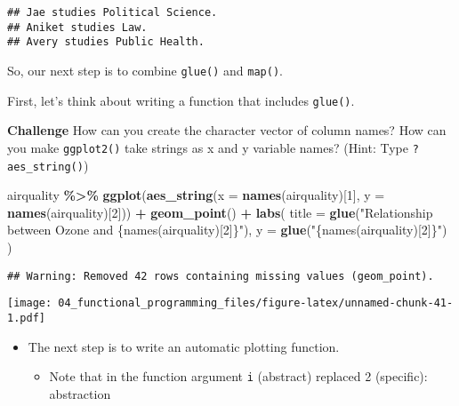 \documentclass[
]{book}
\newenvironment{Shaded}{\begin{snugshade}}{\end{snugshade}}
\newcommand{\DataTypeTok}[1]{\textcolor[rgb]{0.13,0.29,0.53}{#1}}
\newcommand{\DecValTok}[1]{\textcolor[rgb]{0.00,0.00,0.81}{#1}}
\newcommand{\KeywordTok}[1]{\textcolor[rgb]{0.13,0.29,0.53}{\textbf{#1}}}
\newcommand{\NormalTok}[1]{#1}
\newcommand{\OperatorTok}[1]{\textcolor[rgb]{0.81,0.36,0.00}{\textbf{#1}}}
\newcommand{\StringTok}[1]{\textcolor[rgb]{0.31,0.60,0.02}{#1}}
\providecommand{\tightlist}{%
  \setlength{\itemsep}{0pt}\setlength{\parskip}{0pt}}
\begin{document}
\begin{verbatim}
## Jae studies Political Science.
## Aniket studies Law.
## Avery studies Public Health.
\end{verbatim}

So, our next step is to combine \texttt{glue()} and \texttt{map()}.

First, let's think about writing a function that includes \texttt{glue()}.

\textbf{Challenge}
How can you create the character vector of column names?
How can you make \texttt{ggplot2()} take strings as x and y variable names? (Hint: Type \texttt{?aes\_string()})

\begin{Shaded}
\begin{Highlighting}[]
\NormalTok{airquality }\OperatorTok{\%\textgreater{}\%}
\StringTok{  }\KeywordTok{ggplot}\NormalTok{(}\KeywordTok{aes\_string}\NormalTok{(}\DataTypeTok{x =} \KeywordTok{names}\NormalTok{(airquality)[}\DecValTok{1}\NormalTok{], }\DataTypeTok{y =} \KeywordTok{names}\NormalTok{(airquality)[}\DecValTok{2}\NormalTok{])) }\OperatorTok{+}
\StringTok{  }\KeywordTok{geom\_point}\NormalTok{() }\OperatorTok{+}
\StringTok{  }\KeywordTok{labs}\NormalTok{(}
    \DataTypeTok{title =} \KeywordTok{glue}\NormalTok{(}\StringTok{"Relationship between Ozone and \{names(airquality)[2]\}"}\NormalTok{),}
    \DataTypeTok{y =} \KeywordTok{glue}\NormalTok{(}\StringTok{"\{names(airquality)[2]\}"}\NormalTok{)}
\NormalTok{  )}
\end{Highlighting}
\end{Shaded}

\begin{verbatim}
## Warning: Removed 42 rows containing missing values (geom_point).
\end{verbatim}

\texttt{[image: 04\_functional\_programming\_files/figure-latex/unnamed-chunk-41-1.pdf]}

\begin{itemize}
\item
  The next step is to write an automatic plotting function.

  \begin{itemize}
  \tightlist
  \item
    Note that in the function argument \texttt{i} (abstract) replaced 2 (specific): abstraction
  \end{itemize}
\end{itemize}
\end{document}
